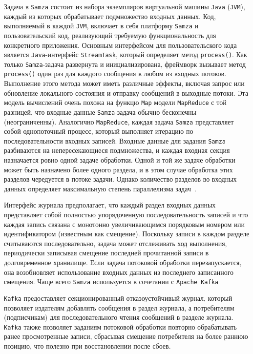 Задача в \texttt{Samza} состоит из набора экземпляров виртуальной машины \texttt{Java} (\texttt{JVM}), каждый из которых обрабатывает подмножество входных данных. 
Код, выполняемый в каждой \texttt{JVM}, включает в себя платформу \texttt{Samza} и пользовательский код, реализующий требуемую функциональность для конкретного приложения. 
Основным интерфейсом для пользовательского кода является \texttt{Java}-интерфейс \texttt{StreamTask}, который определяет метод \texttt{process()}. 
Как только \texttt{Samza}-задача развернута и инициализирована, фреймворк вызывает метод \texttt{process()} один раз для каждого сообщения в любом из входных потоков. 
Выполнение этого метода может иметь различные эффекты, включая запрос или обновление локального состояния и отправку сообщений в выходные потоки. 
Эта модель вычислений очень похожа на функцю \texttt{Map} модели \texttt{MapReduce} с той разницей, что входные данные \texttt{Samza}-задача обычно бесконечны (неограниченны). 
Аналогично \texttt{MapReduce}, каждая задача \texttt{Samza} представляет собой однопоточный процесс, который выполняет итерацию по последовательности входных записей. 
Входные данные для задания \texttt{Samza} разбиваются на непересекающиеся подмножества, и каждая входная секция назначается ровно одной задаче обработки. 
Одной и той же задаче обработки может быть назначено более одного раздела, и в этом случае обработка этих разделов чередуется в потоке задачи. 
Однако количество разделов во входных данных определяет максимальную степень параллелизма задач~\cite{Kleppmann2018}.

Интерфейс журнала предполагает, что каждый раздел входных данных представляет собой полностью упорядоченную последовательность записей и что каждая запись связана с монотонно увеличивающимся порядковым номером или идентификатором (известным как смещение). 
Поскольку записи в каждом разделе считываются последовательно, задача может отслеживать ход выполнения, периодически записывая смещение последней прочитанной записи в долговременное хранилище. 
Если задача потоковой обработки перезапускается, она возобновляет использование входных данных из последнего записанного смещения. 
Чаще всего \texttt{Samza} используется в сочетании с \texttt{Apache Kafka}

\texttt{Kafka} предоставляет секционированный отказоустойчивый журнал, который позволяет издателям добавлять сообщения в раздел журнала, а потребителям (подписчикам) для последовательного чтения сообщений в разделе журнала.
\texttt{Kafka} также позволяет заданиям потоковой обработки повторно обрабатывать ранее просмотренные записи, сбрасывая смещение потребителя на более раннюю позицию, что полезно при восстановлении после сбоев.

